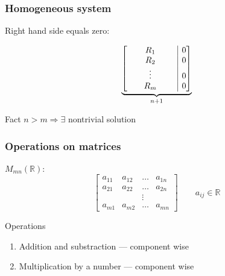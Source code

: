 \documentclass[fullscreen=true, bookmarks=true, hyperref={pdfencoding=unicode}]{beamer}
\begin{document}
\begin{frame}
  \frametitle{Homogeneous system}

  Right hand side equals zero:

  \begin{equation*}
    \underbrace{
        \left[\begin{matrix}
          \quad & R_1  & \quad & \multicolumn{1}{|c}{0} \\
          & R_2  &   & \multicolumn{1}{|c}{0} \\
          & \vdots &   & \multicolumn{1}{|c}{0} \\
          & R_m  &   & \multicolumn{1}{|c}{0} \\
        \end{matrix}\right]
    }_{n+1}
  \end{equation*}

  \pause
  \begin{block}{Fact}
    $n>m \Rightarrow \exists $ nontrivial solution 
  \end{block}
\end{frame}


\begin{frame}
  \frametitle{Operations on matrices}
  $M_{mn}(\mathbb{R}):$
  $$\left[\begin{matrix}
    a_{11} & a_{12} & \dots &  a_{1n} \\
    a_{21} & a_{22} & \dots &  a_{2n} \\
           &        & \vdots &        \\
    a_{m1} & a_{m2} & \dots &  a_{mn} 
  \end{matrix}\right] \qquad a_{ij} \in \mathbb{R}
  $$

  Operations
  \begin{enumerate}
    \item Addition and substraction — component wise
    \item Multiplication by a number — component wise
  \end{enumerate}

\end{frame}
\end{document}
